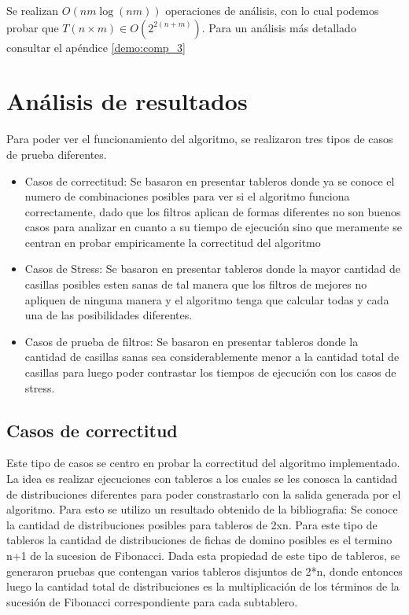 \documentclass[a4paper, 12pt] {article}
\begin{document}
Se realizan $O\left( nm \log\left(  nm \right) \right) $ operaciones de an\'alisis, con lo cual podemos probar que $T\left( n \times m\right) \in O(2^{2\left( n+m\right) })$. Para un an\'alisis m\'as detallado consultar el ap\'endice \ref{demo:comp_3}



\section*{An\'alisis de resultados}
Para poder ver el funcionamiento del algoritmo, se realizaron tres tipos de casos de prueba diferentes.

\begin{itemize}
 \item Casos de correctitud: Se basaron en presentar tableros donde ya se conoce el numero de combinaciones posibles para ver si el algoritmo funciona correctamente, dado que los filtros aplican de formas diferentes no son buenos casos para analizar en cuanto a su tiempo de ejecuci\'on sino que meramente se centran en probar empiricamente la correctitud del algoritmo
\item Casos de Stress: Se basaron en presentar tableros donde la mayor cantidad de casillas posibles esten sanas de tal manera que los filtros de mejores no apliquen de ninguna manera y el algoritmo tenga que calcular todas y cada una de las posibilidades diferentes.
\item Casos de prueba de filtros: Se basaron en presentar tableros donde la cantidad de casillas sanas sea considerablemente menor a la cantidad total de casillas para luego poder contrastar los tiempos de ejecuci\'on con los casos de stress.
\end{itemize}


\subsection*{Casos de correctitud}
Este tipo de casos se centro en probar la correctitud del algoritmo implementado. La idea es realizar ejecuciones con tableros a los cuales se les conosca la cantidad de distribuciones diferentes para poder constrastarlo con la salida generada por el algoritmo. Para esto se utilizo un resultado obtenido de la bibliografia: Se conoce la cantidad de distribuciones posibles para tableros de 2xn. Para este tipo de tableros la cantidad de distribuciones de fichas de domino posibles es el termino n+1 de la sucesion de Fibonacci. Dada esta propiedad de este tipo de tableros, se generaron pruebas que contengan varios tableros disjuntos de 2*n, donde entonces luego la cantidad total de distribuciones es la multiplicaci\'on de los t\'erminos de la sucesi\'on de Fibonacci correspondiente para cada subtablero.
\end{document}

